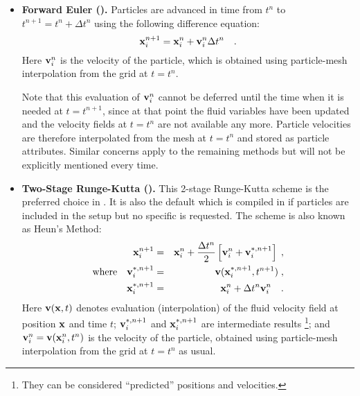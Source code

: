 \begin{itemize}
\item {\bf Forward Euler ().}
Particles are
      advanced in time from $t^n$ to $t^{n+1} = t^n + \Delta t^n$
      using the following difference equation:
      \begin{equation}
    \label{Eqn:particle_passive_euler}
      {\bf x}_i^{n+1} = {\bf x}_i^n + {\bf v}_i^n\Delta t^n \quad.
      \end{equation}
Here ${\bf v}_i^n$ is the velocity of the particle, which is obtained using particle-mesh interpolation from the grid
at $t=t^n$.

Note that this evaluation of ${\bf v}_i^n$ cannot be deferred until the time when it is
needed at $t=t^{n+1}$, since at that point the fluid variables have been updated
and the velocity fields at $t=t^n$ are not available any more. Particle velocities are therefore
interpolated from the mesh at $t=t^n$ and stored as particle attributes.
Similar concerns apply to the remaining methods but will not be explicitly mentioned
every time.



\item{\textbf{Two-Stage Runge-Kutta ().}}
This 2-stage Runge-Kutta scheme is the preferred choice in \flashx. It is also the default which
is compiled in if particles are included in the setup but no specific \childunit is requested.
The scheme is also known as Heun's Method:
      \begin{eqnarray}
    \label{Eqn:particle_passive_rk2}
      {\bf x}_i^{n+1} &=& {\bf x}_i^n + \frac{\Delta t^n}{2} 
                     \left[ {\bf v}_i^n + {\bf v}_i^{*,n+1} \right]      \;,\\
      \hbox{where}\quad {\bf v}_i^{*,n+1} &=& {\bf v}({\bf x}_i^{*,n+1},t^{n+1})    \;,\nonumber\\
      {\bf x}_i^{*,n+1} &=& {\bf x}_i^n + \Delta t^n
                     {\bf v}_i^n       \quad.\nonumber
      \end{eqnarray}
Here ${\bf v}({\bf x},t)$ denotes evaluation (interpolation) of the fluid velocity field
at position $\bf x$ and time $t$;
      ${\bf v}_i^{*,n+1}$ and ${\bf x}_i^{*,n+1}$ are intermediate
results \footnote{They can be considered ``predicted'' positions and velocities.};
and
${\bf v}_i^n = {\bf v}({\bf x}_i^{n},t^{n})$ is the velocity of the particle, obtained using particle-mesh interpolation from the grid
at $t=t^n$ as usual.



\end{itemize}
